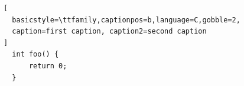 \documentclass{article}
\begin{document}
\begin{lstlisting}[
  basicstyle=\ttfamily,captionpos=b,language=C,gobble=2,
  caption=first caption, caption2=second caption
]
  int foo() {
      return 0;
  }
\end{lstlisting}
\end{document}
